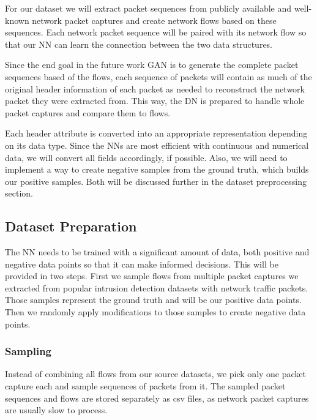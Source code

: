 \documentclass[
	ngerman,
	ruledheaders=section,%
	class=report,%
	thesis={type=bachelor},%
	accentcolor=9c,%
	custommargins=true,%
	marginpar=false,%
	parskip=half-,%
	fontsize=11pt,%
]{tudapub}
\begin{document}
For our dataset we will extract packet sequences from publicly available and well-known network packet captures and create network flows based on these sequences.
Each network packet sequence will be paired with its network flow so that our NN can learn the connection between the two data structures.

Since the end goal in the future work GAN is to generate the complete packet sequences based of the flows,
each sequence of packets will contain as much of the original header information of each packet as needed to reconstruct the network packet they were extracted from.
This way, the DN is prepared to handle whole packet captures and compare them to flows.

Each header attribute is converted into an appropriate representation depending on its data type.
Since the NNs are most efficient with continuous and numerical data, we will convert all fields accordingly, if possible.
Also, we will need to implement a way to create negative samples from the ground truth, which builds our positive samples.
Both will be discussed further in the dataset preprocessing section.

\subsection{Dataset Preparation}

The NN needs to be trained with a significant amount of data, both positive and negative data points so that it can make informed decisions.
This will be provided in two steps.
First we sample flows from multiple packet captures we extracted from popular intrusion detection datasets with network traffic packets.
Those samples represent the ground truth and will be our positive data points.
Then we randomly apply modifications to those samples to create negative data points.

\subsubsection{Sampling}

Instead of combining all flows from our source datasets, we pick only one packet capture each and sample sequences of packets from it.
The sampled packet sequences and flows are stored separately as csv files, as network packet captures are usually slow to process.
\end{document}
